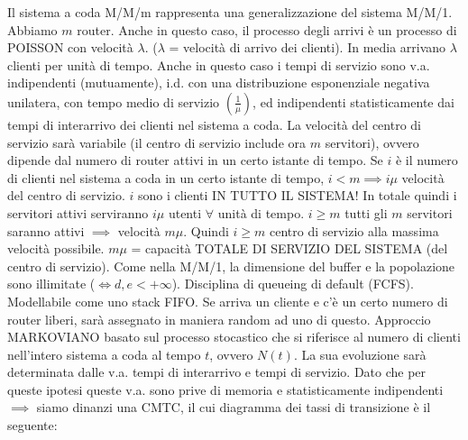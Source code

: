 Il sistema a coda M/M/m rappresenta una generalizzazione del sistema M/M/1. Abbiamo $m$ router.
Anche in questo caso, il processo degli arrivi è un processo di POISSON con velocità $\lambda$. ($\lambda$ = velocità di arrivo dei clienti). In media arrivano $\lambda$ clienti per unità di tempo. Anche in questo caso i tempi di servizio sono v.a. indipendenti (mutuamente), i.d. con una distribuzione esponenziale negativa unilatera, con tempo medio di servizio $(\frac{1}{\mu})$, ed indipendenti statisticamente dai tempi di interarrivo dei clienti nel sistema a coda. La velocità del centro di servizio sarà variabile (il centro di servizio include ora $m$ servitori), ovvero dipende dal numero di router attivi in un certo istante di tempo. Se $i$ è il numero di clienti nel sistema a coda in un certo istante di tempo, $i<m \implies i\mu$ velocità del centro di servizio. $i$ sono i clienti IN TUTTO IL SISTEMA! In totale quindi i servitori attivi serviranno $i\mu$ utenti $\forall$ unità di tempo. $i\geq m$ tutti gli $m$ servitori saranno attivi $\implies$ velocità $m\mu$. Quindi $i\geq m$ centro di servizio alla massima velocità possibile. $m\mu$ = capacità TOTALE DI SERVIZIO DEL SISTEMA (del centro di servizio). Come nella M/M/1, la dimensione del buffer e la popolazione sono illimitate ($\iff d,e<+\infty$). Disciplina di queueing di default (FCFS). Modellabile come uno stack FIFO. Se arriva un cliente e c'è un certo numero di router liberi, sarà assegnato in maniera random ad uno di questo. Approccio MARKOVIANO basato sul processo stocastico che si riferisce al numero di clienti nell'intero sistema a coda al tempo $t$, ovvero $N(t)$. La sua evoluzione sarà determinata dalle v.a. tempi di interarrivo e tempi di servizio. Dato che per queste ipotesi queste v.a. sono prive di memoria e statisticamente indipendenti $\implies$ siamo dinanzi una CMTC, il cui diagramma dei tassi di transizione è il seguente:

